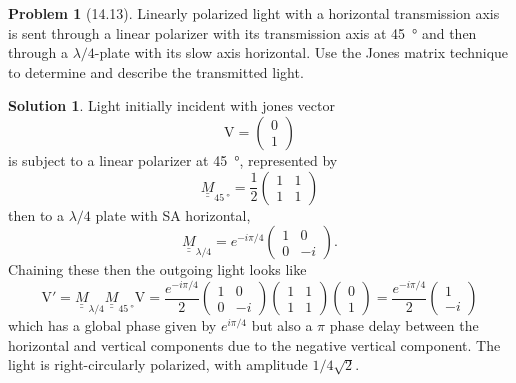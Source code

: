 \documentclass[10pt]{article}
\theoremstyle{definition}
\newtheorem{problem}{Problem}
\newtheorem{soln}{Solution}
\newcommand{\bv}[1]{\bm{\mathrm{#1}}}
\newcommand{\dul}[1]{\underline{\underline{#1}}}
\begin{document}
\begin{problem}[14.13]
Linearly polarized light with a horizontal transmission axis is sent through a linear polarizer with its transmission axis
at \qty{45}{\degree} and then through a $\lambda/4$-plate with its slow axis horizontal. Use the Jones matrix technique to determine
and describe the transmitted light.
\end{problem}
\begin{soln}
  Light initially incident with jones vector $$\bv{V}=\begin{pmatrix}
      0 \\1
    \end{pmatrix}$$
  is subject to a linear polarizer at \qty{45}{\degree}, represented by
  $$\dul{M}_{\qty{45}{\degree}}=\frac{1}{2}\begin{pmatrix}
      1 & 1 \\
      1 & 1
    \end{pmatrix}$$
  then to a $\lambda/4$ plate with SA horizontal,
  $$\dul{M}_{\lambda/4}=e^{-i\pi/4}\begin{pmatrix}
      1 & 0  \\
      0 & -i
    \end{pmatrix}.$$
  Chaining these then the outgoing light looks like
  $$\bv{V}'=\dul{M}_{\lambda/4}\dul{M}_{\qty{45}{\degree}}\bv{V}=\frac{e^{-i\pi/4}}{2}\begin{pmatrix}
      1 & 0  \\
      0 & -i
    \end{pmatrix}\begin{pmatrix}
      1 & 1 \\
      1 & 1
    \end{pmatrix}\begin{pmatrix}
      0 \\1
    \end{pmatrix}=\frac{e^{-i\pi/4}}{2}\begin{pmatrix}
      1 \\
      -i
    \end{pmatrix}$$
  which has a global phase given by $e^{i\pi/4}$ but also a $\pi$ phase delay between the horizontal and vertical components due to the negative
  vertical component. The light is right-circularly polarized, with amplitude $1/4\sqrt{2}$.
\end{soln}
\end{document}
